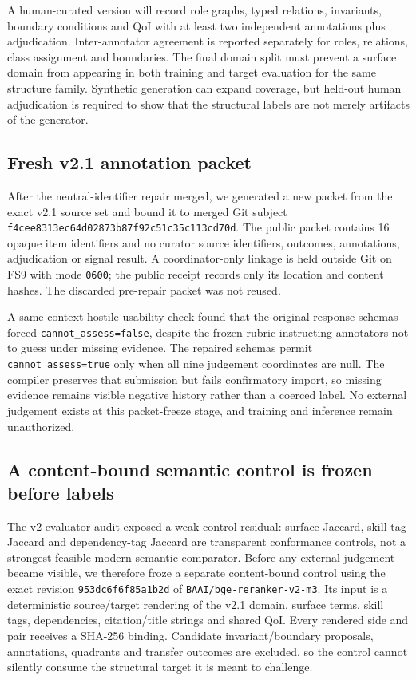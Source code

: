 A human-curated version will record role graphs, typed relations, invariants, boundary conditions and QoI with at least two independent annotations plus adjudication. Inter-annotator agreement is reported separately for roles, relations, class assignment and boundaries. The final domain split must prevent a surface domain from appearing in both training and target evaluation for the same structure family. Synthetic generation can expand coverage, but held-out human adjudication is required to show that the structural labels are not merely artifacts of the generator.

\subsection{Fresh v2.1 annotation packet}
After the neutral-identifier repair merged, we generated a new packet from the exact v2.1 source set and bound it to merged Git subject \texttt{f4cee8313ec64d02873b87f92c51c35c113cd70d}. The public packet contains 16 opaque item identifiers and no curator source identifiers, outcomes, annotations, adjudication or signal result. A coordinator-only linkage is held outside Git on FS9 with mode \texttt{0600}; the public receipt records only its location and content hashes. The discarded pre-repair packet was not reused.

A same-context hostile usability check found that the original response schemas forced \texttt{cannot\_assess=false}, despite the frozen rubric instructing annotators not to guess under missing evidence. The repaired schemas permit \texttt{cannot\_assess=true} only when all nine judgement coordinates are null. The compiler preserves that submission but fails confirmatory import, so missing evidence remains visible negative history rather than a coerced label. No external judgement exists at this packet-freeze stage, and training and inference remain unauthorized.

\subsection{A content-bound semantic control is frozen before labels}

The v2 evaluator audit exposed a weak-control residual: surface Jaccard, skill-tag Jaccard and dependency-tag Jaccard are transparent conformance controls, not a strongest-feasible modern semantic comparator.  Before any external judgement became visible, we therefore froze a separate content-bound control using the exact revision \texttt{953dc6f6f85a1b2d} of \texttt{BAAI/bge-reranker-v2-m3}.  Its input is a deterministic source/target rendering of the v2.1 domain, surface terms, skill tags, dependencies, citation/title strings and shared QoI.  Every rendered side and pair receives a SHA-256 binding.  Candidate invariant/boundary proposals, annotations, quadrants and transfer outcomes are excluded, so the control cannot silently consume the structural target it is meant to challenge.

